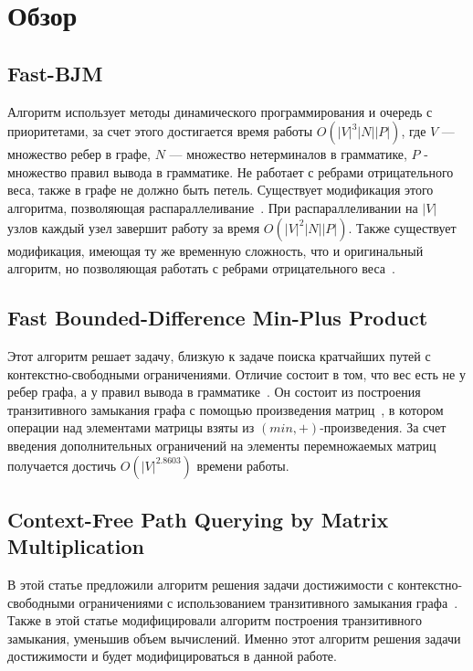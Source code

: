 \documentclass[14pt]{matmex-diploma}
\theoremstyle{definition}
\begin{document}
\section{Обзор}
    \subsection{Fast-BJM}
        Алгоритм использует методы динамического программирования и очередь с приоритетами, за счет этого достигается время работы $O(|V|^3|N||P|)$, где $V$ --- множество ребер в графе, $N$ --- множество нетерминалов в грамматике, $P$ - множество правил вывода в грамматике. Не работает с ребрами отрицательного веса, также в графе не должно быть петель.
        Существует модификация этого алгоритма, позволяющая распараллеливание~\cite{D-Fast-BJM}. При распараллеливании на $|V|$ узлов каждый узел завершит работу за время $O(|V|^2|N||P|)$.
        Также существует модификация, имеющая ту же временную сложность, что и оригинальный алгоритм, но позволяющая работать с ребрами отрицательного веса~\cite{Johnson-Fast-BJM}. 
        
    \subsection{Fast Bounded-Difference Min-Plus Product}
        Этот алгоритм решает задачу, близкую к задаче поиска кратчайших путей с контекстно-свободными ограничениями.
        Отличие состоит в том, что вес есть не у ребер графа, а у правил вывода в грамматике~\cite{DBLP:journals/corr/BringmannGSW17}.
        Он состоит из построения транзитивного замыкания графа с помощью произведения матриц~\cite{VALIANT1975308}, в котором операции над элементами матрицы взяты из  $(min, +)$-произведения.
        За счет введения дополнительных ограничений на элементы перемножаемых матриц получается достичь $O(|V|^{2.8603})$ времени работы.

    \subsection{Context-Free Path Querying by Matrix Multiplication}
        В этой статье предложили алгоритм решения задачи достижимости с контекстно-свободными ограничениями с использованием транзитивного замыкания графа~\cite{VALIANT1975308}. Также в этой статье модифицировали алгоритм построения транзитивного замыкания, уменьшив объем вычислений. Именно этот алгоритм решения задачи достижимости и будет модифицироваться в данной работе.
        
\end{document}
